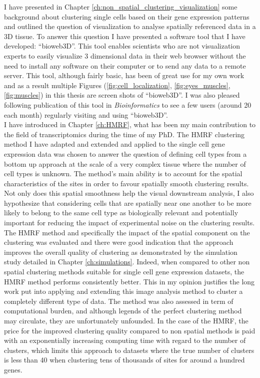 I have presented in Chapter \ref{ch:non_spatial_clustering_visualization} some background about clustering single cells based on their gene expression patterns and outlined the question of visualization to analyse spatially referenced data in a 3D tissue. To answer this question I have presented a software tool that I have developed: ``bioweb3D''. This tool enables scientists who are not visualization experts to easily visualize 3 dimensional data in their web browser without the need to install any software on their computer or to send any data to a remote server. This tool, although fairly basic, has been of great use for my own work and as a result multiple Figures (\ref{fig:cell_localization}, \ref{fig:eyes_muscles}, \ref{fig:muscles}) in this thesis are screen shots of ``bioweb3D''. I was also pleased following publication of this tool in \emph{Bioinformatics} \citep{Pettit13} to see a few users (around 20 each month) regularly visiting and using ``bioweb3D''.\\


I have introduced in Chapter \ref{ch:HMRF}, what has been my main contribution to the field of transcriptomics during the time of my PhD. The HMRF clustering method I have adapted and extended and applied to the single cell gene expression data was chosen to answer the question of defining cell types from a bottom up approach at the scale of a very complex tissue where the number of cell types is unknown. The method's main ability is to account for the spatial characteristics of the sites in order to favour spatially smooth clustering results. Not only does this spatial smoothness help the visual downstream analysis, I also hypothesize that considering cells that are spatially near one another to be more likely to belong to the same cell type as biologically relevant and potentially important for reducing the impact of experimental noise on the clustering results.\\

 The HMRF method and specifically the impact of the spatial component on the clustering was evaluated and there were good indication that the approach improves the overall quality of clustering as demonstrated by the simulation study detailed in Chapter \ref{ch:simulations}. Indeed, when compared to other non spatial clustering methods suitable for single cell gene expression datasets, the HMRF method performs consistently better. This in my opinion justifies the long work put into applying and extending this image analysis method to cluster a completely different type of data. The method was also assessed in term of computational burden, and although legends of the perfect clustering method may circulate, they are unfortunately unfounded. In the case of the HMRF, the price for the improved clustering quality compared to non spatial methods is paid with an exponentially increasing computing time with regard to the number of clusters, which limits this approach to datasets where the true number of clusters is less than 40 when clustering tens of thousands of sites for around a hundred genes. \\
 
